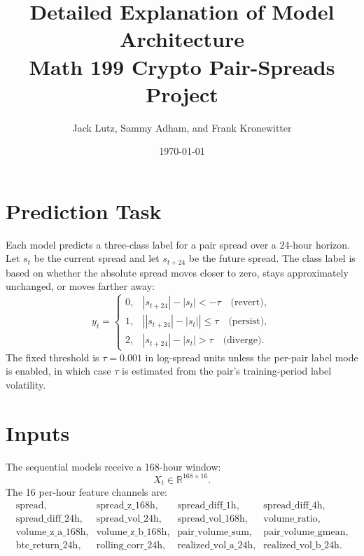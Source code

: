 \documentclass[11pt]{article}
\title{Detailed Explanation of Model Architecture\\
\large Math 199 Crypto Pair-Spreads Project}
\author{Jack Lutz, Sammy Adham, and Frank Kronewitter}
\date{\today}
\begin{document}
\maketitle

\begin{center}
\end{center}

\section{Prediction Task}

Each model predicts a three-class label for a pair spread over a 24-hour
horizon. Let \(s_t\) be the current spread and let \(s_{t+24}\) be the future
spread. The class label is based on whether the absolute spread moves closer
to zero, stays approximately unchanged, or moves farther away:
\[
y_t =
\begin{cases}
0, & |s_{t+24}| - |s_t| < -\tau \quad \text{(revert)},\\
1, & \left||s_{t+24}| - |s_t|\right| \leq \tau \quad \text{(persist)},\\
2, & |s_{t+24}| - |s_t| > \tau \quad \text{(diverge)}.
\end{cases}
\]
The fixed threshold is \(\tau=0.001\) in log-spread units unless the per-pair
label mode is enabled, in which case \(\tau\) is estimated from the pair's
training-period label volatility.

\section{Inputs}

The sequential models receive a 168-hour window:
\[
X_t \in \mathbb{R}^{168 \times 16}.
\]
The 16 per-hour feature channels are:
\[
\begin{array}{llll}
\text{spread}, & \text{spread\_z\_168h}, & \text{spread\_diff\_1h}, &
\text{spread\_diff\_4h},\\
\text{spread\_diff\_24h}, & \text{spread\_vol\_24h}, &
\text{spread\_vol\_168h}, & \text{volume\_ratio},\\
\text{volume\_z\_a\_168h}, & \text{volume\_z\_b\_168h}, &
\text{pair\_volume\_sum}, & \text{pair\_volume\_gmean},\\
\text{btc\_return\_24h}, & \text{rolling\_corr\_24h}, &
\text{realized\_vol\_a\_24h}, & \text{realized\_vol\_b\_24h}.
\end{array}
\]
\end{document}
